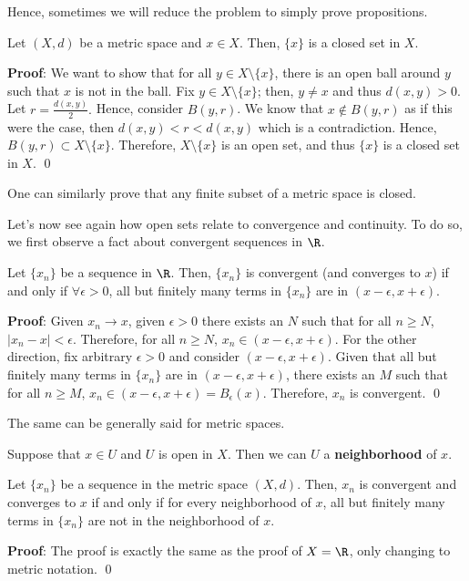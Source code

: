\begin{remark}
    Hence, sometimes we will reduce the problem to simply prove propositions.
\end{remark}


\begin{example}
Let $(X,d)$ be a metric space and $x\in X$. Then, $\{x\}$ is a closed set in $X$.
\end{example}
\textbf{Proof}: We want to show that for all $y \in X\setminus \{x\}$, there is an open ball around $y$ such that $x$ is not in the ball. Fix $y\in X\setminus \{x\}$; then, $y\neq x$ and thus $d(x,y) >0$. Let $r = \frac{d(x,y)}{2}.$ Hence, consider $B(y,r)$. We know that $x\notin B(y,r)$ as if this were the case, then $d(x,y) < r< d(x,y)$ which is a contradiction. Hence, $B(y,r) \subset X\setminus \{x\}$. Therefore, $X\setminus \{x\}$ is an open set, and thus $\{x\}$ is a closed set in $X$. \qed 

\begin{remark}
One can similarly prove that any finite subset of a metric space is closed.
\end{remark}

Let's now see again how open sets relate to convergence and continuity. To do so, we first observe a fact about convergent sequences in $\R$.
\begin{proposition}
Let $\{x_n\}$ be a sequence in $\R$. Then, $\{x_n\}$ is convergent (and converges to $x$) if and only if $\forall \epsilon>0$, all but finitely many terms in $\{x_n\}$ are in $(x-\epsilon, x+\epsilon).$
\end{proposition}
\textbf{Proof}: Given $x_n\to x$, given $\epsilon>0$ there exists an $N$ such that for all $n\geq N$, $|x_n-x| < \epsilon$. Therefore, for all $n\geq N$, $x_n \in (x-\epsilon, x+\epsilon).$ For the other direction, fix arbitrary $\epsilon >0$ and consider $(x-\epsilon, x+\epsilon)$. Given that all but finitely many terms in $\{x_n\}$ are in $(x-\epsilon, x+\epsilon)$, there exists an $M$ such that for all $n\geq M$, $x_n \in (x-\epsilon, x+\epsilon) = B_\epsilon(x)$. Therefore, $x_n$ is convergent. \qed 

The same can be generally said for metric spaces.
\begin{definition}[Neighborhood]
Suppose that $x\in U$ and $U$ is open in $X$. Then we can $U$ a \textbf{neighborhood} of $x$.
\end{definition}
\begin{theorem}
Let $\{x_n\}$ be a sequence in the metric space $(X,d)$. Then, $x_n$ is convergent and converges to $x$ if and only if for every neighborhood of $x$, all but finitely many terms in $\{x_n\}$ are not in the neighborhood of $x.$
\end{theorem}
\textbf{Proof}: The proof is exactly the same as the proof of $X = \R$, only changing to metric notation. \qed 

